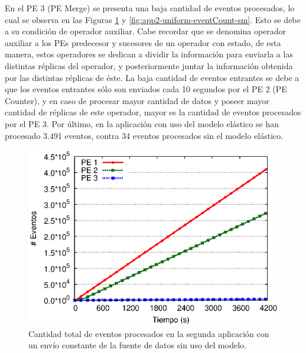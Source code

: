 En el PE 3 (PE Merge) se presenta una baja cantidad de eventos procesados, lo cual se observa en las Figuras \ref{fig:app2-uniform-eventCount-cm} y \ref{fig:app2-uniform-eventCount-sm}. Esto se debe a su condici\'on de operador auxiliar. Cabe recordar que se denomina operador auxiliar a los PEs predecesor y sucesores de un operador con estado, de esta manera, estos operadores se dedican a dividir la informaci\'on para enviarla a las distintas r\'eplicas del operador, y posteriormente juntar la informaci\'on obtenida por las distintas r\'eplicas de \'este. La baja cantidad de eventos entrantes se debe a que los eventos entrantes s\'olo son enviados cada 10 segundos por el PE 2 (PE Counter), y en caso de procesar mayor cantidad de datos y poseer mayor cantidad de r\'eplicas de este operador, mayor es la cantidad de eventos procesados por el PE 3. Por \'ultimo, en la aplicaci\'on con uso del modelo el\'astico se han procesado 3.491 eventos, contra 34 eventos procesados sin el modelo el\'astico.

\begin{figure}[!ht]
\centering
    \includegraphics[scale=0.7]{images/exp/app2/uniform/cm/eventCount.eps}
    \caption{Cantidad total de eventos procesados en la segunda aplicaci\'on con un env\'io constante de la fuente de datos sin uso del modelo.}
    \label{fig:app2-uniform-eventCount-cm}
\end{figure}

